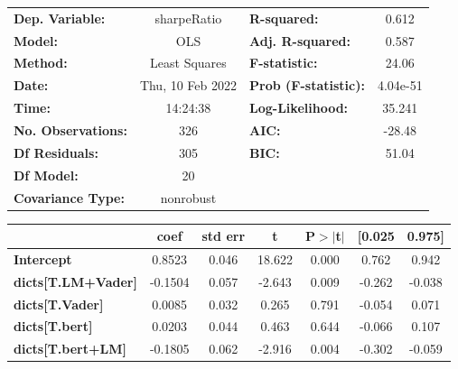 \begin{center}
\begin{tabular}{lclc}
\toprule
\textbf{Dep. Variable:}              &   sharpeRatio    & \textbf{  R-squared:         } &     0.612   \\
\textbf{Model:}                      &       OLS        & \textbf{  Adj. R-squared:    } &     0.587   \\
\textbf{Method:}                     &  Least Squares   & \textbf{  F-statistic:       } &     24.06   \\
\textbf{Date:}                       & Thu, 10 Feb 2022 & \textbf{  Prob (F-statistic):} &  4.04e-51   \\
\textbf{Time:}                       &     14:24:38     & \textbf{  Log-Likelihood:    } &    35.241   \\
\textbf{No. Observations:}           &         326      & \textbf{  AIC:               } &    -28.48   \\
\textbf{Df Residuals:}               &         305      & \textbf{  BIC:               } &     51.04   \\
\textbf{Df Model:}                   &          20      & \textbf{                     } &             \\
\textbf{Covariance Type:}            &    nonrobust     & \textbf{                     } &             \\
\bottomrule
\end{tabular}
\begin{tabular}{lcccccc}
                                     & \textbf{coef} & \textbf{std err} & \textbf{t} & \textbf{P$> |$t$|$} & \textbf{[0.025} & \textbf{0.975]}  \\
\midrule
\textbf{Intercept}                   &       0.8523  &        0.046     &    18.622  &         0.000        &        0.762    &        0.942     \\
\textbf{dicts[T.LM+Vader]}           &      -0.1504  &        0.057     &    -2.643  &         0.009        &       -0.262    &       -0.038     \\
\textbf{dicts[T.Vader]}              &       0.0085  &        0.032     &     0.265  &         0.791        &       -0.054    &        0.071     \\
\textbf{dicts[T.bert]}               &       0.0203  &        0.044     &     0.463  &         0.644        &       -0.066    &        0.107     \\
\textbf{dicts[T.bert+LM]}            &      -0.1805  &        0.062     &    -2.916  &         0.004        &       -0.302    &       -0.059     \\

\end{tabular}
\end{center}
